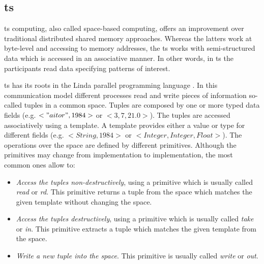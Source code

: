 \subsection{\acl{ts}}
\label{sec:tuplespaces_eoa}


\acf{ts} computing, also called space-based computing, offers an improvement over traditional distributed shared memory approaches.
Whereas the latters work at byte-level and accessing to memory addresses,
the \acl{ts} works with semi-structured data which is accessed in an associative manner.
In other words, in \ac{ts} the participants read data specifying patterns of interest.


\ac{ts} has its roots in the Linda parallel programming language \citep{gelernter_generative_1985}.
In this communication model different processes read and write pieces of information so-called tuples in a common space.
Tuples are composed by one or more typed data fields (e.g. $<"aitor",1984>$ or $<3,7,21.0>$).
The tuples are accessed associatively using a template.
A template provides either a value or type for different fields (e.g. $<String,1984>$ or $<Integer, Integer, Float>$).
The operations over the space are defined by different primitives.
Although the primitives may change from implementation to implementation, the most common ones allow to:

\begin{itemize}
  \item \emph{Access the tuples non-destructively}, using a primitive which is usually called \emph{read} or \emph{rd}.
	This primitive returns a tuple from the space which matches the given template without changing the space.
  \item \emph{Access the tuples destructively}, using a primitive which is usually called \emph{take} or \emph{in}.
	This primitive extracts a tuple which matches the given template from the space.
  \item \emph{Write a new tuple into the space}. This primitive is usually called \emph{write} or \emph{out}.
\end{itemize}